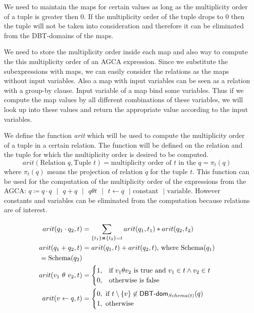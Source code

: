 \documentclass[12pt]{article}
\begin{document}
We need to maintain the maps for certain values as long as the multiplicity order of a tuple is greater then 0. If the multiplicity order of the tuple drops to 0 then the tuple will not be taken into consideration and therefore it can be eliminated from the DBT-domains of the maps.

We need to store the multiplicity order inside each map and also way to compute the this multiplicity order of an AGCA expression. Since we substitute the subexpressions with maps, we can easily consider the relations as the maps without input variables. Also a map with input variables can be seen as a relation with a group-by clause. Input variable of a map bind some variables. Thus if we compute the map values by all different combinations of these variables, we will look up into these values and return the appropriate value according to the input variables.  

We define the function \emph{arit} which will be used to compute the multiplicity order of a tuple in a certain relation. The function will be defined on the relation and the tuple for which the multiplicity order is desired to be computed. $$arit(\text{Relation } q,\text{Tuple } t)=\text{multiplicity order of }t\text{ in the } q =\pi_{t}(q)$$ where $\pi_{t}(q)$ means the projection of relation $q$ for the tuple $t$. This function can be used for the computation of the multiplicity order of the expressions from the AGCA: $q\coloneqq q\cdot q\text{ }|\text{ }q+q\text{ }|\text{ }q \theta t\text{ }|\text{ }t\gets q\text{ }|\text{ constant}\text{ }|\text{ variable}$. However constants and variables can be eliminated from the computation because relations are of interest.

\begin{align}
arit(q_{1}\cdot q_{2},t)&=\sum\limits_{\{t_{1}\}\Join \{t_{2}\}={t}}^{}arit(q_{1},t_{1})*arit(q_{2},t_{2})\\
arit(q_{1} + q_{2},t)&=arit(q_{1},t)+arit(q_{2},t)\text{, where Schema}(q_{1})\\=\text{Schema}(q_{2})\\
arit(v_1\text{ } \theta \text{ } v_2,t)&=\begin{cases}1,& \mbox{if } v_1\theta v_2 \mbox{ is true and }v_{1}\in t \land v_{2}\in t\\
0,& \text{otherwise} \mbox{ is false} 
\end{cases}\\
arit(v\gets q,t)&=\begin{cases}0, \mbox{ if $t\setminus\{v\}\not\in \text{\textsf{DBT-dom}}_{Schema(t)}(q)$}\\ 1, \mbox{ otherwise} \end{cases}
\end{align}
\end{document}
